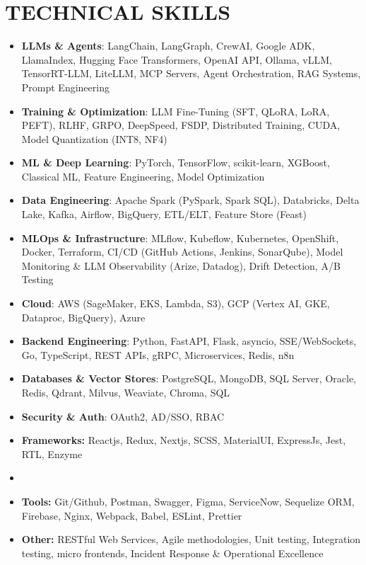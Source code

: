 \documentclass[a4paper]{article}
\begin{document}
\section*{TECHNICAL SKILLS}
\setlength{\arrayrulewidth}{1.2pt}
\begin{itemize}
\item \textbf{LLMs \& Agents}{: LangChain, LangGraph, CrewAI, Google ADK, LlamaIndex, Hugging Face Transformers, OpenAI API, Ollama, vLLM, TensorRT-LLM, LiteLLM, MCP Servers, Agent Orchestration, RAG Systems, Prompt Engineering}
\item \textbf{Training \& Optimization}{: LLM Fine-Tuning (SFT, QLoRA, LoRA, PEFT), RLHF, GRPO, DeepSpeed, FSDP, Distributed Training, CUDA, Model Quantization (INT8, NF4)}
\item \textbf{ML \& Deep Learning}{: PyTorch, TensorFlow, scikit-learn, XGBoost, Classical ML, Feature Engineering, Model Optimization}
\item \textbf{Data Engineering}{: Apache Spark (PySpark, Spark SQL), Databricks, Delta Lake, Kafka, Airflow, BigQuery, ETL/ELT, Feature Store (Feast)}
\item \textbf{MLOps \& Infrastructure}{: MLflow, Kubeflow, Kubernetes, OpenShift, Docker, Terraform, CI/CD (GitHub Actions, Jenkins, SonarQube), Model Monitoring \& LLM Observability (Arize, Datadog), Drift Detection, A/B Testing}
\item \textbf{Cloud}{: AWS (SageMaker, EKS, Lambda, S3), GCP (Vertex AI, GKE, Dataproc, BigQuery), Azure}
\item \textbf{Backend Engineering}{: Python, FastAPI, Flask, asyncio, SSE/WebSockets, Go, TypeScript, REST APIs, gRPC, Microservices, Redis, n8n}
\item \textbf{Databases \& Vector Stores}{: PostgreSQL, MongoDB, SQL Server, Oracle, Redis, Qdrant, Milvus, Weaviate, Chroma, SQL}
\item \textbf{Security \& Auth}{: OAuth2, AD/SSO, RBAC}
\item \textbf{Frameworks:} Reactjs, Redux, Nextjs, SCSS, MaterialUI, ExpressJs, Jest, RTL, Enzyme
\item \item \textbf{Tools:} Git/Github, Postman, Swagger, Figma, ServiceNow, Sequelize ORM, Firebase, Nginx, Webpack, Babel, ESLint, Prettier
\item \textbf{Other:} RESTful Web Services, Agile methodologies, Unit testing, Integration testing, micro frontends, Incident Response \& Operational Excellence
\end{itemize}
\end{document}
